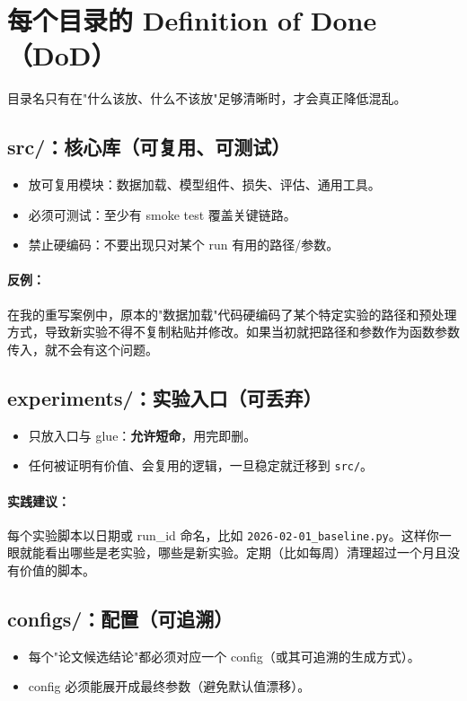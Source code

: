 \section{每个目录的 Definition of Done（DoD）}
目录名只有在"什么该放、什么不该放"足够清晰时，才会真正降低混乱。

\subsection{src/：核心库（可复用、可测试）}
\begin{itemize}
  \item 放可复用模块：数据加载、模型组件、损失、评估、通用工具。
  \item 必须可测试：至少有 smoke test 覆盖关键链路。
  \item 禁止硬编码：不要出现只对某个 run 有用的路径/参数。
\end{itemize}

\paragraph{反例：}在我的重写案例中，原本的"数据加载"代码硬编码了某个特定实验的路径和预处理方式，导致新实验不得不复制粘贴并修改。如果当初就把路径和参数作为函数参数传入，就不会有这个问题。

\subsection{experiments/：实验入口（可丢弃）}
\begin{itemize}
  \item 只放入口与 glue：\textbf{允许短命}，用完即删。
  \item 任何被证明有价值、会复用的逻辑，一旦稳定就迁移到 \texttt{src/}。
\end{itemize}

\paragraph{实践建议：}每个实验脚本以日期或 run\_id 命名，比如 \texttt{2026-02-01\_baseline.py}。这样你一眼就能看出哪些是老实验，哪些是新实验。定期（比如每周）清理超过一个月且没有价值的脚本。

\subsection{configs/：配置（可追溯）}
\begin{itemize}
  \item 每个"论文候选结论"都必须对应一个 config（或其可追溯的生成方式）。
  \item config 必须能展开成最终参数（避免默认值漂移）。
\end{itemize}

